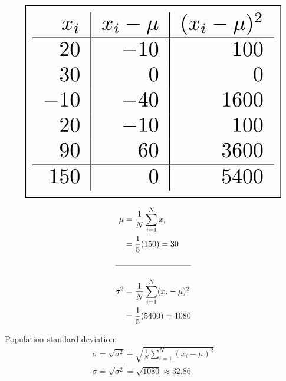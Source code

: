 \documentclass[../Notes.tex]{subfiles}
\begin{document}
    \horizontal

    \begin{multicols}{3}
        \begin{equation*}
            \begin{gathered}
                \resizebox{0.9\hsize}{!}{\boxed{
                \begin{array}{r | r | r}
                    x_i & x_i - \mu & (x_i - \mu)^2\\
                    \hline      
                    20  & -10 & 100     \\
                    30  & 0   & 0       \\
                    -10 & -40 & 1600    \\
                    20  & -10 & 100     \\
                    90  & 60  & 3600    \\
                    \hline      
                    150 & 0 & 5400       
                \end{array}}}
            \end{gathered}
        \end{equation*}

        \columnbreak

        \begin{align*}
            \mu & = \frac{1}{N}\sum\limits_{i=1}^{N}x_i       \\
                & = \frac{1}{5}(150) = 30                     \\  
                \\
            \hline
            \\
            \sigma^2 & = \frac{1}{N}\sum_{i=1}^{N}(x_i-\mu)^2 \\
                    & = \frac{1}{5}(5400) = 1080
        \end{align*}

        \columnbreak

        Population standard deviation:
        \hfill
        \begin{equation*}
            \begin{gathered}
                \sigma = \sqrt{\sigma^2} + \sqrt{\frac{1}{N}\sum_{i=1}^{N}(x_i-\mu)^2}  \\
                \sigma = \sqrt{\sigma^2} = \sqrt{1080} \approx 32.86
            \end{gathered}
        \end{equation*}

    \end{multicols}
\end{document}
